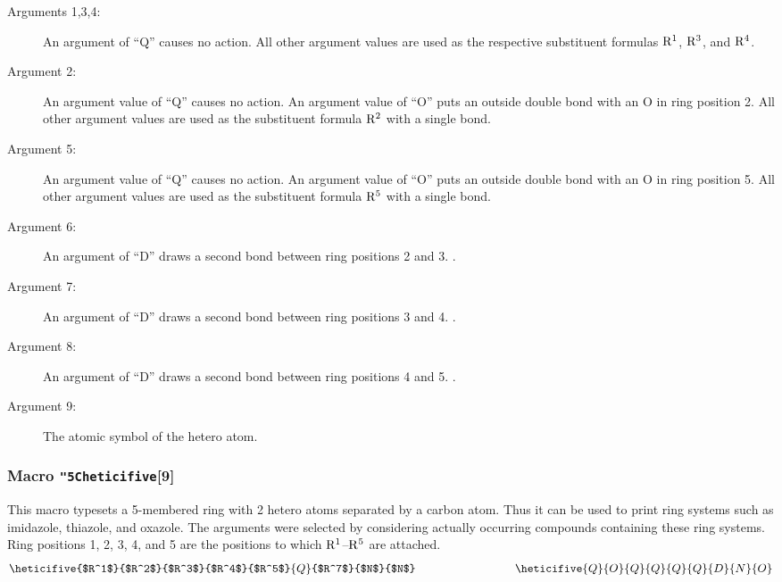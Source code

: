  \begin{description}
 \item[{\rm Arguments 1,3,4:}] An argument of ``Q''
      causes no action. All other argument values are used
      as the respective substituent formulas ${\rm R^1}$,
      ${\rm R^3}$, and ${\rm R^4}$.
 \item[{\rm Argument 2:}] An argument value of ``Q''
      causes no action. An argument value of ``O'' puts an
      outside double bond with an O in ring position 2.
      All other argument values are used as the substituent
      formula ${\rm R^2}$ with a single bond.
 \item[{\rm Argument 5:}] An argument value of ``Q''
      causes no action. An argument value of ``O'' puts an
      outside double bond with an O in ring position 5.
      All other argument values are used as the substituent
      formula ${\rm R^5}$ with a single bond.
 \item[{\rm Argument 6:}] An argument of ``D'' draws
      a second bond between ring positions 2 and 3. \rii .
 \item[{\rm Argument 7:}] An argument of ``D'' draws
      a second bond between ring positions 3 and 4. \rii .
 \item[{\rm Argument 8:}] An argument of ``D'' draws
      a second bond between ring positions 4 and 5. \rii .
 \item[{\rm Argument 9:}] The atomic symbol of the
      hetero atom.
 \end{description}
 
\subsubsection{Macro {\tt\char"5C{}heticifive}[9]}
   This macro typesets a 5-membered ring with 2 hetero atoms
 separated by a carbon atom. Thus it can be used to print ring
 systems such as imidazole, thiazole, and oxazole. The arguments
 were selected by considering actually occurring compounds
 containing these ring systems. Ring positions 1, 2, 3, 4, and 5
 are the positions to which ${\rm R^1}$--${\rm R^5}$ are
 attached.
 \[ \heticifive{$R^1$}{$R^2$}{$R^3$}{$R^4$}{$R^5$}{Q}{$R^7$}
    {$N$}{$N$}     \hspace{3cm}
    \heticifive{Q}{O}{Q}{Q}{Q}{Q}{D}{N}{O} \]
 
